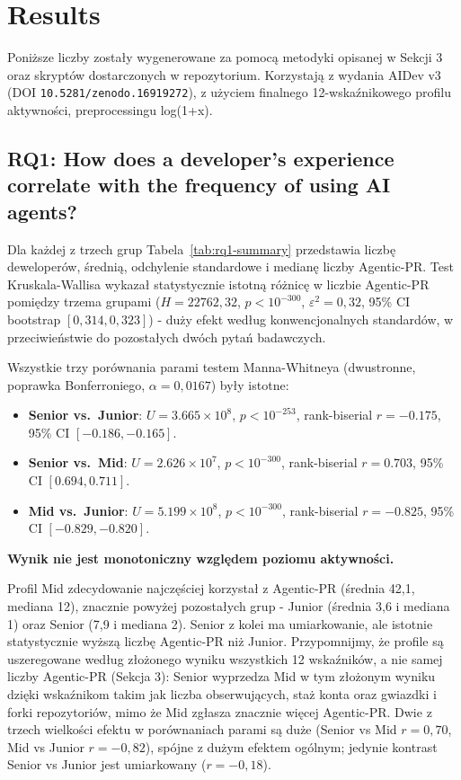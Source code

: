\section{Results\label{sec:results}}
Poniższe liczby zostały wygenerowane za pomocą metodyki opisanej w Sekcji 3 oraz skryptów dostarczonych w repozytorium. Korzystają z wydania AIDev v3 (DOI \texttt{10.5281/zenodo.16919272}), z użyciem finalnego 12-wskaźnikowego profilu aktywności, preprocessingu log(1+x).

\subsection{RQ1: How does a developer's experience correlate with the frequency of using AI agents?}
Dla każdej z trzech grup Tabela~\ref{tab:rq1-summary} przedstawia liczbę deweloperów, średnią, odchylenie standardowe i medianę liczby Agentic-PR. Test Kruskala-Wallisa wykazał statystycznie istotną różnicę w liczbie Agentic-PR pomiędzy trzema grupami ($H = 22762{,}32$, $p < 10^{-300}$, $\varepsilon^2 = 0{,}32$, 95\% CI bootstrap $[0{,}314, 0{,}323]$) - duży efekt według konwencjonalnych standardów, w przeciwieństwie do pozostałych dwóch pytań badawczych.

Wszystkie trzy porównania parami testem Manna-Whitneya (dwustronne, poprawka Bonferroniego, $\alpha = 0{,}0167$) były istotne:
\begin{itemize}
    \item \textbf{Senior vs.\ Junior}: $U = 3.665\times10^{8}$, $p < 10^{-253}$, rank-biserial $r = -0.175$, 95\% CI $[-0.186, -0.165]$.
    \item \textbf{Senior vs.\ Mid}: $U = 2.626\times10^{7}$, $p < 10^{-300}$, rank-biserial $r = 0.703$, 95\% CI $[0.694, 0.711]$.
    \item \textbf{Mid vs.\ Junior}: $U = 5.199\times10^{8}$, $p < 10^{-300}$, rank-biserial $r = -0.825$, 95\% CI $[-0.829, -0.820]$.
\end{itemize}

\textbf{Wynik nie jest monotoniczny względem poziomu aktywności.}

Profil Mid zdecydowanie najczęściej korzystał z Agentic-PR (średnia 42,1, mediana 12), znacznie powyżej pozostałych grup - Junior (średnia 3,6 i mediana 1) oraz Senior (7,9 i mediana 2). Senior z kolei ma umiarkowanie, ale istotnie statystycznie wyższą liczbę Agentic-PR niż Junior. Przypomnijmy, że profile są uszeregowane według złożonego wyniku wszystkich 12 wskaźników, a nie samej liczby Agentic-PR (Sekcja 3): Senior wyprzedza Mid w tym złożonym wyniku dzięki wskaźnikom takim jak liczba obserwujących, staż konta oraz gwiazdki i forki repozytoriów, mimo że Mid zgłasza znacznie więcej Agentic-PR. Dwie z trzech wielkości efektu w porównaniach parami są duże (Senior vs Mid $r = 0{,}70$, Mid vs Junior $r = -0{,}82$), spójne z dużym efektem ogólnym; jedynie kontrast Senior vs Junior jest umiarkowany ($r = -0{,}18$).

